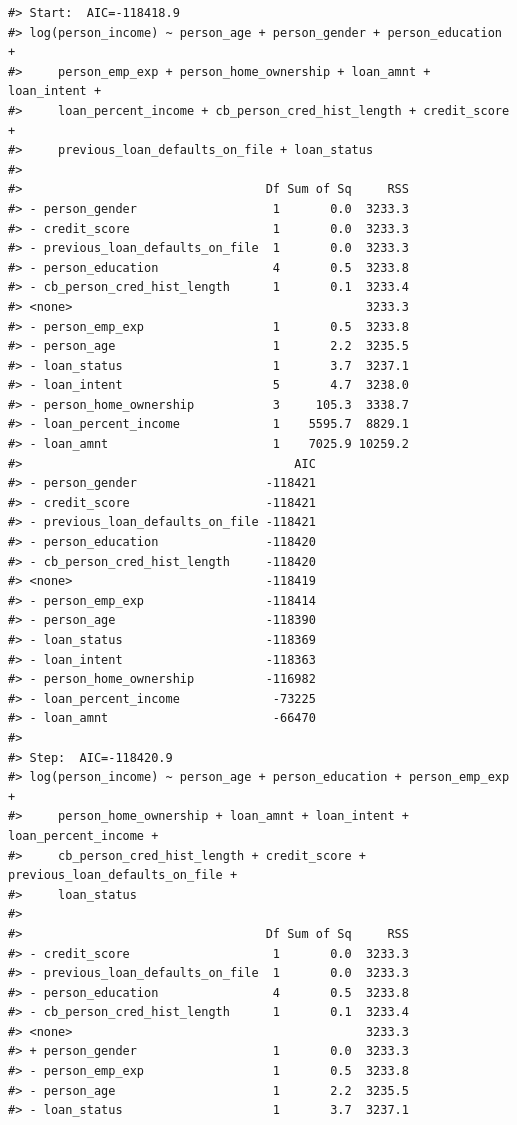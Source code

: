 \documentclass[
  10pt,
]{article}
\begin{document}
\begin{verbatim}
#> Start:  AIC=-118418.9
#> log(person_income) ~ person_age + person_gender + person_education + 
#>     person_emp_exp + person_home_ownership + loan_amnt + loan_intent + 
#>     loan_percent_income + cb_person_cred_hist_length + credit_score + 
#>     previous_loan_defaults_on_file + loan_status
#> 
#>                                  Df Sum of Sq     RSS
#> - person_gender                   1       0.0  3233.3
#> - credit_score                    1       0.0  3233.3
#> - previous_loan_defaults_on_file  1       0.0  3233.3
#> - person_education                4       0.5  3233.8
#> - cb_person_cred_hist_length      1       0.1  3233.4
#> <none>                                         3233.3
#> - person_emp_exp                  1       0.5  3233.8
#> - person_age                      1       2.2  3235.5
#> - loan_status                     1       3.7  3237.1
#> - loan_intent                     5       4.7  3238.0
#> - person_home_ownership           3     105.3  3338.7
#> - loan_percent_income             1    5595.7  8829.1
#> - loan_amnt                       1    7025.9 10259.2
#>                                      AIC
#> - person_gender                  -118421
#> - credit_score                   -118421
#> - previous_loan_defaults_on_file -118421
#> - person_education               -118420
#> - cb_person_cred_hist_length     -118420
#> <none>                           -118419
#> - person_emp_exp                 -118414
#> - person_age                     -118390
#> - loan_status                    -118369
#> - loan_intent                    -118363
#> - person_home_ownership          -116982
#> - loan_percent_income             -73225
#> - loan_amnt                       -66470
#> 
#> Step:  AIC=-118420.9
#> log(person_income) ~ person_age + person_education + person_emp_exp + 
#>     person_home_ownership + loan_amnt + loan_intent + loan_percent_income + 
#>     cb_person_cred_hist_length + credit_score + previous_loan_defaults_on_file + 
#>     loan_status
#> 
#>                                  Df Sum of Sq     RSS
#> - credit_score                    1       0.0  3233.3
#> - previous_loan_defaults_on_file  1       0.0  3233.3
#> - person_education                4       0.5  3233.8
#> - cb_person_cred_hist_length      1       0.1  3233.4
#> <none>                                         3233.3
#> + person_gender                   1       0.0  3233.3
#> - person_emp_exp                  1       0.5  3233.8
#> - person_age                      1       2.2  3235.5
#> - loan_status                     1       3.7  3237.1

\end{verbatim}
\end{document}

